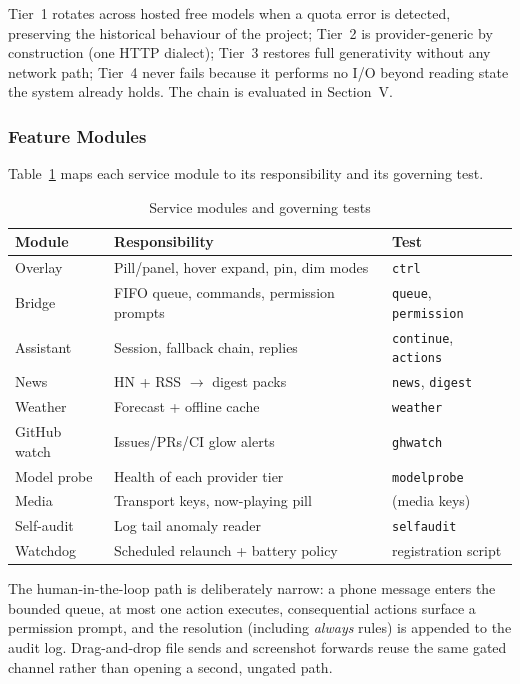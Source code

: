 Tier~1 rotates across hosted free models when a quota error is
detected, preserving the historical behaviour of the project;
Tier~2 is provider-generic by construction (one HTTP dialect);
Tier~3 restores full generativity without any network path;
Tier~4 never fails because it performs no I/O beyond reading
state the system already holds. The chain is evaluated in
Section~V.

\subsubsection{Feature Modules}

Table~\ref{tab:modules} maps each service module to its
responsibility and its governing test.

\begin{table}[t]
\centering\small
\caption{Service modules and governing tests}\label{tab:modules}
\begin{tabular}{@{}p{}p{}p{}@{}}
\toprule
\textbf{Module} & \textbf{Responsibility} & \textbf{Test} \\
\midrule
Overlay & Pill/panel, hover expand, pin, dim modes & \texttt{ctrl} \\
Bridge & FIFO queue, commands, permission prompts & \texttt{queue}, \texttt{permission} \\
Assistant & Session, fallback chain, replies & \texttt{continue}, \texttt{actions} \\
News & HN + RSS $\rightarrow$ digest packs & \texttt{news}, \texttt{digest} \\
Weather & Forecast + offline cache & \texttt{weather} \\
GitHub watch & Issues/PRs/CI glow alerts & \texttt{ghwatch} \\
Model probe & Health of each provider tier & \texttt{modelprobe} \\
Media & Transport keys, now-playing pill & (media keys) \\
Self-audit & Log tail anomaly reader & \texttt{selfaudit} \\
Watchdog & Scheduled relaunch + battery policy & registration script \\
\bottomrule
\end{tabular}
\end{table}

The human-in-the-loop path is deliberately narrow: a phone
message enters the bounded queue, at most one action executes,
consequential actions surface a permission prompt, and the
resolution (including \emph{always} rules) is appended to the
audit log. Drag-and-drop file sends and screenshot forwards
reuse the same gated channel rather than opening a second,
ungated path.
